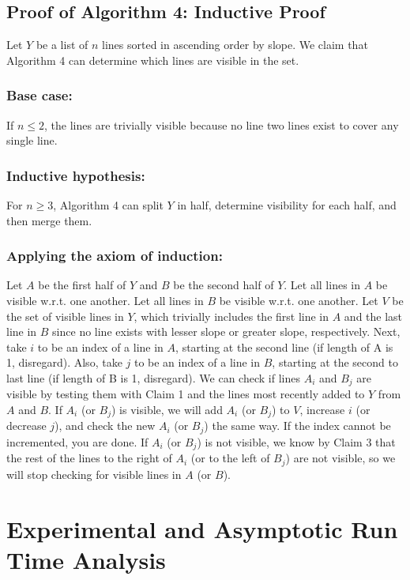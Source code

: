\documentclass{article}
\begin{document}
\subsection*{Proof of Algorithm 4: Inductive Proof}
    Let $Y$ be a list of $n$ lines sorted in ascending order by slope. We claim that Algorithm 4 can determine which lines are visible in the set.
    \subsubsection*{Base case:} If $n \leq 2$, the lines are trivially visible because no line two lines exist to cover any single line.
    \subsubsection*{Inductive hypothesis:} For $n \geq 3$, Algorithm 4 can split $Y$ in half, determine visibility for each half, and then merge them.
    \subsubsection*{Applying the axiom of induction:} Let $A$ be the first half of $Y$ and $B$ be the second half of $Y$. Let all lines in $A$ be visible w.r.t. one another. Let all lines in $B$ be visible w.r.t. one another. Let $V$ be the set of visible lines in $Y$, which trivially includes the first line in $A$ and the last line in $B$ since no line exists with lesser slope or greater slope, respectively. Next, take $i$ to be an index of a line in $A$, starting at the second line (if length of A is 1, disregard). Also, take $j$ to be an index of a line in $B$, starting at the second to last line (if length of B is 1, disregard). 
    We can check if lines $A_{i}$ and $B_{j}$ are visible by testing them with Claim 1 and the lines most recently added to $Y$ from $A$ and $B$. If $A_{i}$ (or $B_{j}$) is visible, we will add $A_{i}$ (or $B_{j}$) to $V$, increase $i$ (or decrease $j$), and check the new $A_{i}$ (or $B_{j}$) the same way. If the index cannot be incremented, you are done. If $A_{i}$ (or $B_{j}$) is not visible, we know by Claim 3 that the rest of the lines to the right of $A_{i}$ (or to the left of $B_{j}$) are not visible, so we will stop checking for visible lines in $A$ (or $B$).


\section*{Experimental and Asymptotic Run Time Analysis}
\end{document}
